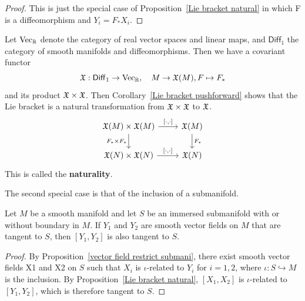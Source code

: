 \begin{proof}
This is just the special case of Proposition~\ref{Lie bracket natural} in which F is a diffeomorphism and $Y_i=F_*X_i$.
\end{proof}
\begin{remark}
Let $\mathrm{Vec}_{\mathbb{R}}$ denote the category of real vector spaces and linear maps, and $\mathsf{Diff}_1$ the category of smooth manifolds and diffeomorphisms. Then we have a covariant functor \[\mathfrak{X}:\mathsf{Diff}_1\to\mathrm{Vec}_{\mathbb{R}},\quad M\to\mathfrak{X}(M), F\mapsto F_*\] 
and its product $\mathfrak{X}\times\mathfrak{X}$. Then Corollary~\ref{Lie bracket pushforward} shows that the Lie bracket is a natural transformation from $\mathfrak{X}\times\mathfrak{X}$ to $\mathfrak{X}$. 
\[\begin{tikzcd}
\X(M)\times\X(M)\ar[d,swap,"F_*\times F_*"]\ar[r,"{[\cdot,\cdot]}"]&\X(M)\ar[d,"F_*"]\\
\X(N)\times\X(N)\ar[r,"{[\cdot,\cdot]}"]&\X(N)
\end{tikzcd}\]
This is called the \textbf{naturality}.
\end{remark}
The second special case is that of the inclusion of a submanifold.
\begin{corollary}\label{Lie bracket tangent to submani}
Let $M$ be a smooth manifold and let $S$ be an immersed submanifold with or without boundary in $M$. If $Y_1$ and $Y_2$ are smooth vector fields on $M$ that are tangent to $S$, then $[Y_1,Y_2]$ is also tangent to $S$.
\end{corollary}
\begin{proof}
By Proposition~\ref{vector field restrict submani}, there exist smooth vector fields X1 and X2 on $S$ such that $X_i$ is $\iota$-related to $Y_i$ for $i=1,2$, where $\iota:S\hookrightarrow M$ is the inclusion. By Proposition~\ref{Lie bracket natural}, $[X_1,X_2]$ is $\iota$-related to $[Y_1,Y_2]$, which is therefore tangent to $S$.
\end{proof}
